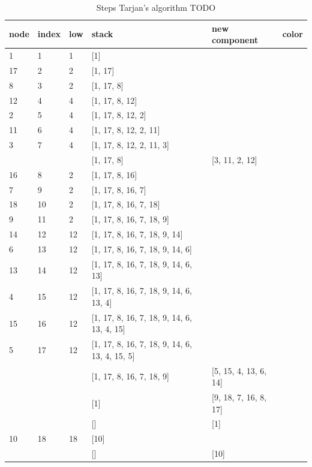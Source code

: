 \documentclass{l4proj}
\begin{document}
\begin{table}[H]
\centering
\begin{tabular}{|l|l|l|l|l|l|}
\hline
node & index & low & stack & new component & color \\
\hline
1& 1 & 1 & [1] & & \cellcolor{babyblue} \\
\hline
17& 2 & 2 & [1, 17] & & \cellcolor{yellow} \\
\hline
8& 3 & 2 & [1, 17, 8] & & \cellcolor{yellow} \\
\hline
12& 4 & 4 & [1, 17, 8, 12] & & \cellcolor{amber} \\
\hline
2& 5 & 4 & [1, 17, 8, 12, 2] & & \cellcolor{amber} \\
\hline
11& 6 & 4 & [1, 17, 8, 12, 2, 11] & & \cellcolor{amber} \\
\hline
3& 7 & 4 & [1, 17, 8, 12, 2, 11, 3] & & \cellcolor{amber} \\
\hline
& & & [1, 17, 8] & [3, 11, 2, 12] & \\
\hline
16& 8 & 2 & [1, 17, 8, 16] & & \cellcolor{yellow} \\
\hline
7& 9 & 2 & [1, 17, 8, 16, 7] & & \cellcolor{yellow} \\
\hline
18& 10 & 2 & [1, 17, 8, 16, 7, 18] & & \cellcolor{yellow} \\
\hline
9& 11 & 2 & [1, 17, 8, 16, 7, 18, 9] & & \cellcolor{yellow} \\
\hline
14& 12 & 12 & [1, 17, 8, 16, 7, 18, 9, 14] & & \cellcolor{applegreen} \\
\hline
6& 13 & 12 & [1, 17, 8, 16, 7, 18, 9, 14, 6] & & \cellcolor{applegreen} \\
\hline
13& 14 & 12 & [1, 17, 8, 16, 7, 18, 9, 14, 6, 13] & & \cellcolor{applegreen} \\
\hline
4& 15 & 12 & [1, 17, 8, 16, 7, 18, 9, 14, 6, 13, 4] & & \cellcolor{applegreen} \\
\hline
15& 16 & 12 & [1, 17, 8, 16, 7, 18, 9, 14, 6, 13, 4, 15] & & \cellcolor{applegreen} \\
\hline
5& 17 & 12 & [1, 17, 8, 16, 7, 18, 9, 14, 6, 13, 4, 15, 5] & & \cellcolor{applegreen} \\
\hline
& & & [1, 17, 8, 16, 7, 18, 9] & [5, 15, 4, 13, 6, 14] & \\
\hline
& & & [1] & [9, 18, 7, 16, 8, 17] & \\
\hline
& & & [] & [1] & \\
\hline
10& 18 & 18 & [10] & & \cellcolor{americanrose} \\
\hline
& & & [] & [10] & \\
\hline
\end{tabular}
\caption{Steps Tarjan's algorithm TODO}
\label{ttable} %
\end{table}
\end{document}
